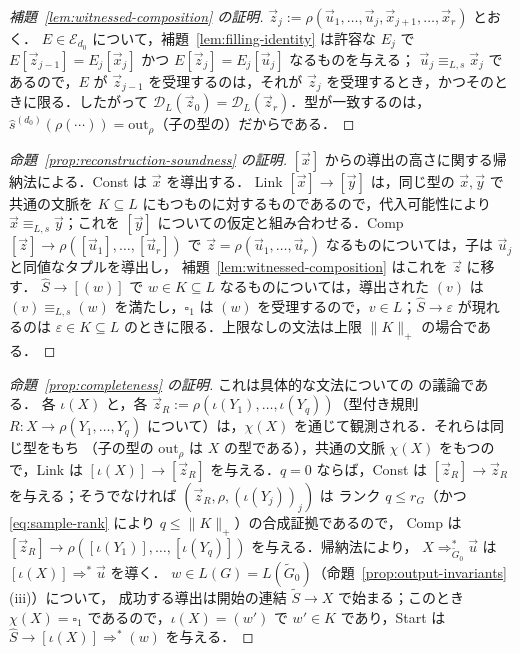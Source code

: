 \documentclass[11pt,a4paper]{ltjsarticle}
\numberwithin{equation}{section}
\theoremstyle{plain}
\theoremstyle{definition}
\theoremstyle{remark}
\newcommand{\D}{\mathcal{D}}
\newcommand{\out}{\mathrm{out}}
\newcommand{\tuple}[1]{\vec{#1}}
\newcommand{\blank}{\square}
\newcommand{\eps}{\varepsilon}
\theoremstyle{plain}
\begin{document}
\begin{proof}[補題~\ref{lem:witnessed-composition} の証明]
$\tuple z_j:=\rho(\tuple u_1,\ldots,\tuple u_j,\tuple x_{j+1},\ldots,\tuple x_r)$ とおく．
$E\in\mathcal E_{d_0}$ について，補題~\ref{lem:filling-identity} は許容な $E_j$ で
$E[\tuple z_{j-1}]=E_j[\tuple x_j]$ かつ $E[\tuple z_j]=E_j[\tuple u_j]$ なるものを与える；
$\tuple u_j\equiv_{L,s}\tuple x_j$ であるので，$E$ が $\tuple z_{j-1}$ を受理するのは，それが
$\tuple z_j$ を受理するとき，かつそのときに限る．したがって $\D_L(\tuple z_0)=\D_L(\tuple z_r)$．型が一致するのは，
$\widehat s^{(d_0)}(\rho(\cdots))=\out_\rho$（子の型の）だからである．
\end{proof}

\begin{proof}[命題~\ref{prop:reconstruction-soundness} の証明]
$[\tuple x]$ からの導出の高さに関する帰納法による．Const は $\tuple x$ を導出する．
Link $[\tuple x]\to[\tuple y]$ は，同じ型の $\tuple x,\tuple y$ で共通の文脈を
$K\subseteq L$ にもつものに対するものであるので，代入可能性により $\tuple x\equiv_{L,s}\tuple y$；これを
$[\tuple y]$ についての仮定と組み合わせる．Comp
$[\tuple z]\to\rho([\tuple u_1],\ldots,[\tuple u_r])$ で $\tuple z=\rho(\tuple u_1,
\ldots,\tuple u_r)$ なるものについては，子は $\tuple u_j$ と同値なタプルを導出し，
補題~\ref{lem:witnessed-composition} はこれを $\tuple z$ に移す．
$\widehat S\to[(w)]$ で $w\in K\subseteq L$ なるものについては，導出された $(v)$ は
$(v)\equiv_{L,s}(w)$ を満たし，$\blank_1$ は $(w)$ を受理するので，$v\in L$；$\widehat S\to\eps$ が現れるのは
$\eps\in K\subseteq L$ のときに限る．上限なしの文法は上限 $\|K\|_+$ の場合である．
\end{proof}

\begin{proof}[命題~\ref{prop:completeness} の証明]
これは具体的な文法についての \cite[Lemma~3]{Yoshinaka2015General} の議論である．
各 $\iota(X)$ と，各
$\tuple z_R:=\rho(\iota(Y_1),\ldots,\iota(Y_q))$（型付き規則
$R:X\to\rho(Y_1,\ldots,Y_q)$ について）は，$\chi(X)$ を通じて観測される．それらは同じ型をもち
（子の型の $\out_\rho$ は $X$ の型である），共通の文脈
$\chi(X)$ をもつので，Link は $[\iota(X)]\to[\tuple z_R]$ を与える．$q=0$ ならば，Const は
$[\tuple z_R]\to\tuple z_R$ を与える；そうでなければ $(\tuple z_R,\rho,(\iota(Y_j))_j)$ は
ランク $q\le r_G$（かつ \eqref{eq:sample-rank} により $q\le\|K\|_+$）の合成証拠であるので，
Comp は $[\tuple z_R]\to\rho([\iota(Y_1)],\ldots,[\iota(Y_q)])$ を与える．帰納法により，
$X\Rightarrow^*_{\widetilde G_0}\tuple u$ は $[\iota(X)]\Rightarrow^*\tuple u$ を導く．
$w\in L(G)=L(\widetilde G_0)$（命題~\ref{prop:output-invariants}(iii)）について，
成功する導出は開始の連結 $\widetilde S\to X$ で始まる；このとき
$\chi(X)=\blank_1$ であるので，$\iota(X)=(w')$ で $w'\in K$ であり，Start は
$\widehat S\to[\iota(X)]\Rightarrow^*(w)$ を与える．
\end{proof}
\end{document}
